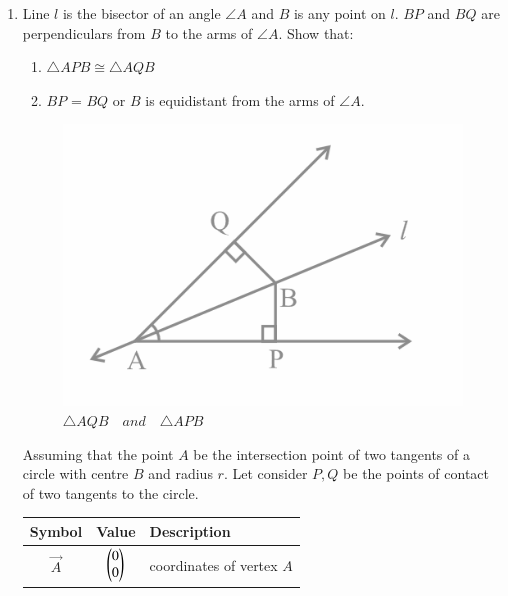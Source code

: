 \begin{enumerate}[label=\thesection.\arabic*,ref=\thesection.\theenumi]

\item Line $l$ is the bisector of an angle $\angle A$ and $B$ is any point on $l$. $BP$ and $BQ$ are perpendiculars from $B$ to the arms of $\angle A$. Show that:
\begin{enumerate}
    \item $\triangle  APB \cong \triangle AQB$  
    \item $BP$ = $BQ$ or $B$ is equidistant from the arms of $\angle A$.
 \end{enumerate}
%
\begin{figure}[H]
    \centering
    \includegraphics[width=0.8\columnwidth]{figs/fig_mc.png}
    \caption{$\triangle AQB \hspace{12pt} and \hspace{12pt} \triangle APB$}
    \label{fig:math_comp1}
\end{figure}
%
Assuming that the point $A$ be the intersection point of two tangents of a circle with centre $B$ and radius $r$. Let consider $P,Q$ be the points of contact of two tangents to the circle.
\begin{table}[H]
\begin{center}
 \begin{tabular}{|c|c|p{6cm}|}
	 \hline  \label{tab:table2}
        \textbf{Symbol} & \textbf{Value} & \textbf{Description} \\
        \hline
	 $\vec{A}$ & $\begin{pmatrix}0 \\ 0\end{pmatrix}$ & coordinates of vertex $A$ \\
        \hline

\end{tabular}
\end{center}
\end{table}
\end{enumerate}
